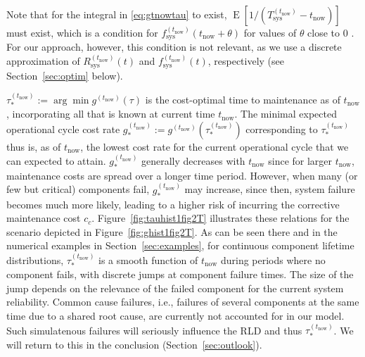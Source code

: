 \documentclass[authoryear]{elsarticle}
\newcommand{\E}{\operatorname{E}}
\def\tnow{t_\text{now}}
\newcommand{\Rsysnow}{R^{(t_\text{now})}_\text{sys}}
\newcommand{\Tsysnow}{T^{(t_\text{now})}_\text{sys}}
\newcommand{\fsysnow}{f^{(t_\text{now})}_\text{sys}}
\newcommand{\gnow}{g^{(\tnow)}}
\newcommand{\tausnow}{\tau_*^{(\tnow)}}
\newcommand{\tstarnow}{t_*^{(\tnow)}}
\newcommand{\gstarnow}{g_*^{(\tnow)}}
\newcommand{\gtotalnow}{g_\text{total}^{(\tnow)}}
\begin{document}
Note that for the integral in \eqref{eq:gtnowtau} to exist,
$\E[1/(\Tsysnow - \tnow)]$ must exist,
which is a condition for $\fsysnow(\tnow + \theta)$ for values of $\theta$ close to $0$ \citep{2006:coolen-schrijner-coolen}.
For our approach, however, this condition is not relevant,
as we use a discrete approximation of $\Rsysnow(t)$ and $\fsysnow(t)$, respectively
(see Section~\ref{sec:optim} below).

$\tausnow := \arg\min \gnow(\tau)$
is the cost-optimal time to maintenance as of $\tnow$,
incorporating all that is known at current time $\tnow$.
The minimal expected operational cycle cost rate $\gstarnow := \gnow(\tausnow)$ corresponding to $\tausnow$
thus is, as of $\tnow$, the lowest cost rate for the current operational cycle
that we can expected to attain.
$\gstarnow$ generally decreases with $\tnow$ since for larger $\tnow$, maintenance costs are spread over a longer time period.
However, when many (or few but critical) components fail, $\gstarnow$ may increase,
since then, system failure becomes much more likely, leading to a higher risk of incurring the corrective maintenance cost $c_c$.
Figure~\ref{fig:tauhist1fig2T} illustrates these relations for the scenario depicted in Figure~\ref{fig:ghist1fig2T}.
%
As can be seen there and in the numerical examples in Section~\ref{sec:examples},
for continuous component lifetime distributions,
$\tausnow$ is a smooth function of $\tnow$ during periods where no component fails,
with discrete jumps at component failure times.
The size of the jump depends on the relevance of the failed component for the current system reliability.
Common cause failures, i.e., failures of several components at the same time due to a shared root cause,
are currently not accounted for in our model. %
Such simulatenous failures will seriously influence the RLD and thus $\tausnow$.
We will return to this in the conclusion (Section~\ref{sec:outlook}).
%
\end{document}
